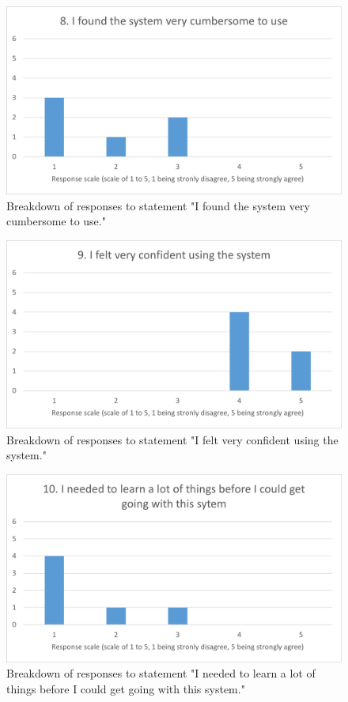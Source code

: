 \documentclass{l4proj}
\begin{document}
\begin{appendices}
\begin{figure}[h]
    \centering
    \includegraphics[width=0.7\linewidth]{images/upload/sus_results/q8.png}
    \caption{Breakdown of responses to statement "I found the system very cumbersome to use."}
    \label{fig:q8}
\end{figure}

\begin{figure}[h]
    \centering
    \includegraphics[width=0.7\linewidth]{images/upload/sus_results/q9.png}
    \caption{Breakdown of responses to statement "I felt very confident using the system."}
    \label{fig:q9}
\end{figure}

\begin{figure}[h]
    \centering
    \includegraphics[width=0.7\linewidth]{images/upload/sus_results/q10.png}
    \caption{Breakdown of responses to statement "I needed to learn a lot of things before I could get going with this system."}
    \label{fig:q10}
\end{figure}




\end{appendices}
\end{document}
